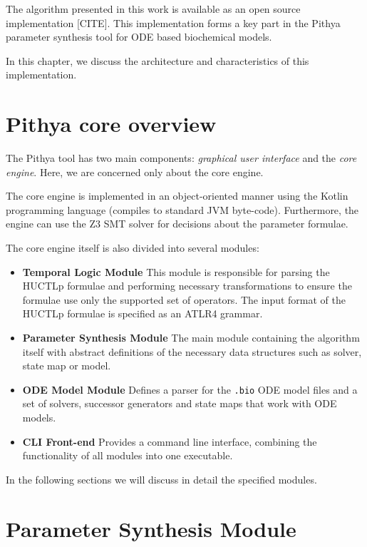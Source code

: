 The algorithm presented in this work is available as an open source implementation [CITE]. This implementation forms a key part in the Pithya parameter synthesis tool for ODE based biochemical models.

In this chapter, we discuss the architecture and characteristics of this implementation.

\section{Pithya core overview}

The Pithya tool has two main components: \emph{graphical user interface} and the \emph{core engine}. Here, we are concerned only about the core engine.

The core engine is implemented in an object-oriented manner using the Kotlin programming language (compiles to standard JVM byte-code). Furthermore, the engine can use the Z3 SMT solver for decisions about the parameter formulae.

The core engine itself is also divided into several modules:

\begin{itemize}
	\item \textbf{Temporal Logic Module} This module is responsible for parsing the \ac{HUCTLp} formulae and performing necessary transformations to ensure the formulae use only the supported set of operators. The input format of the \ac{HUCTLp} formulae is specified as an ATLR4 grammar.
	\item \textbf{Parameter Synthesis Module} The main module containing the algorithm itself with abstract definitions of the necessary data structures such as solver, state map or model.
	\item \textbf{ODE Model Module} Defines a parser for the \texttt{.bio} ODE model files and a set of solvers, successor generators and state maps that work with ODE models.
	\item \textbf{CLI Front-end} Provides a command line interface, combining the functionality of all modules into one executable.
\end{itemize}

In the following sections we will discuss in detail the specified modules.

\section{Parameter Synthesis Module}

